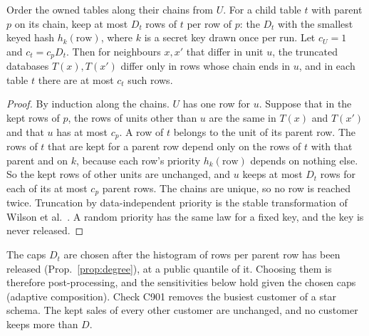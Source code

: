 \setcounter{proposition}{900}
\begin{proposition}\label{prop:bound}
Order the owned tables along their chains from $U$. For a child table $t$ with parent $p$ on its chain, keep at most $D_t$ rows of $t$ per row of $p$: the $D_t$ with the smallest keyed hash $h_k(\text{row})$, where $k$ is a secret key drawn once per run. Let $c_U=1$ and $c_t=c_p D_t$. Then for neighbours $x,x'$ that differ in unit $u$, the truncated databases $T(x),T(x')$ differ only in rows whose chain ends in $u$, and in each table $t$ there are at most $c_t$ such rows.
\end{proposition}
\begin{proof}
By induction along the chains. $U$ has one row for $u$. Suppose that in the kept rows of $p$, the rows of units other than $u$ are the same in $T(x)$ and $T(x')$ and that $u$ has at most $c_p$. A row of $t$ belongs to the unit of its parent row. The rows of $t$ that are kept for a parent row depend only on the rows of $t$ with that parent and on $k$, because each row's priority $h_k(\text{row})$ depends on nothing else. So the kept rows of other units are unchanged, and $u$ keeps at most $D_t$ rows for each of its at most $c_p$ parent rows. The chains are unique, so no row is reached twice. Truncation by data-independent priority is the stable transformation of Wilson et al.\ \cite{wilson2020}. A random priority has the same law for a fixed key, and the key is never released.
\end{proof}
\noindent The caps $D_t$ are chosen after the histogram of rows per parent row has been released (Prop.~\ref{prop:degree}), at a public quantile of it. Choosing them is therefore post-processing, and the sensitivities below hold given the chosen caps (adaptive composition). Check C901 removes the busiest customer of a star schema. The kept sales of every other customer are unchanged, and no customer keeps more than $D$.

